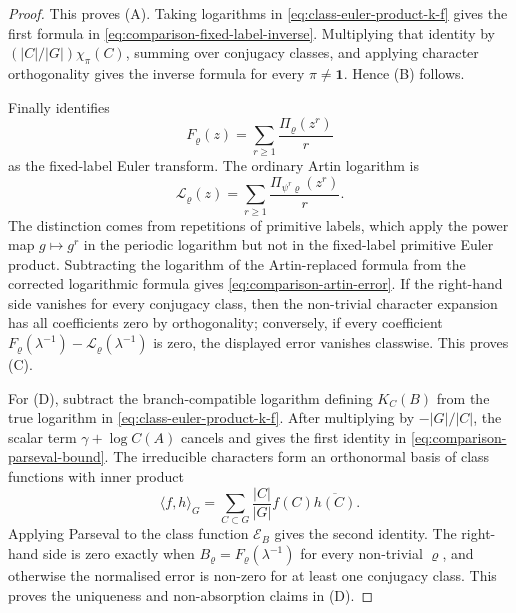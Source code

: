 \documentclass[11pt,a4paper]{amsart}
\theoremstyle{plain}
\theoremstyle{definition}
\theoremstyle{remark}
\begin{document}
\begin{proof}
  This proves \textup{(A)}.  Taking logarithms in
  \eqref{eq:class-euler-product-k-f} gives the first formula in
  \eqref{eq:comparison-fixed-label-inverse}. Multiplying that identity by
  \((|C|/|G|)\chi_\pi(C)\), summing over conjugacy classes, and applying
  character orthogonality gives the inverse formula for every
  \(\pi\ne\mathbf1\).  Hence \textup{(B)} follows.

  Finally  identifies
  \[
    F_\varrho(z)=\sum_{r\ge1}\frac{\Pi_\varrho(z^r)}{r}
  \]
  as the fixed-label Euler transform.  The ordinary Artin logarithm is
  \[
    \mathcal L_\varrho(z)=
    \sum_{r\ge1}\frac{\Pi_{\psi^r\varrho}(z^r)}{r}.
  \]
  The distinction comes from
  repetitions of primitive labels, which apply the power map
  \(g\mapsto g^r\) in the periodic logarithm but not in the fixed-label
  primitive Euler product. Subtracting the logarithm of the Artin-replaced
  formula from the corrected logarithmic formula gives
  \eqref{eq:comparison-artin-error}.  If the right-hand side vanishes for
  every conjugacy class, then the non-trivial character expansion has all
  coefficients zero by orthogonality; conversely, if every coefficient
  \(F_\varrho(\lambda^{-1})-
  \mathcal L_\varrho(\lambda^{-1})\) is zero, the displayed error vanishes
  classwise.  This proves \textup{(C)}.

  For \textup{(D)}, subtract the branch-compatible logarithm defining
  \(K_C(B)\) from the true logarithm in \eqref{eq:class-euler-product-k-f}.
  After multiplying by \(-|G|/|C|\), the scalar term
  \(\gamma+\log C(A)\) cancels and gives the first identity in
  \eqref{eq:comparison-parseval-bound}.  The irreducible characters form an
  orthonormal basis of class functions with inner product
  \[
    \langle f,h\rangle_G=
    \sum_{C\subset G}\frac{|C|}{|G|}f(C)\overline{h(C)}.
  \]
  Applying Parseval to the class function \(\mathscr E_B\) gives the second
  identity.  The right-hand side is zero exactly when
  \(B_\varrho=F_\varrho(\lambda^{-1})\) for every non-trivial
  \(\varrho\), and otherwise the normalised error is non-zero for at least
  one conjugacy class.  This proves the uniqueness and non-absorption claims
  in \textup{(D)}.

\end{proof}
\end{document}
